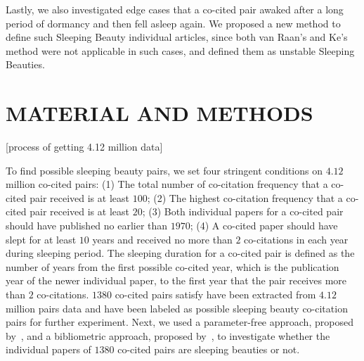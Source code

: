 \documentclass[utf8]{frontiersSCNS}
\begin{document}
Lastly, we also investigated edge cases that a co-cited pair awaked after a long period of dormancy and then fell asleep again. We proposed a new method to define such Sleeping Beauty individual articles, since both van Raan's and Ke's method were not applicable in such cases, and defined them as unstable Sleeping Beauties.

\section{MATERIAL AND METHODS}


[process of getting 4.12 million data]


To find possible sleeping beauty pairs, we set four stringent conditions on $4.12$ million co-cited pairs: (1) The total number of co-citation frequency that a co-cited pair received is at least $100$; (2) The highest co-citation frequency that a co-cited pair received is at least $20$; (3) Both individual papers for a co-cited pair should have published no earlier than $1970$; (4) A co-cited paper should have slept for at least $10$ years and received no more than $2$ co-citations in each year during sleeping period. 
The sleeping duration for a co-cited pair is defined as the number of years from the first possible co-cited year, which is the publication year of the newer individual paper, to the first year that the pair receives more than $2$ co-citations. $1380$ co-cited pairs satisfy have been extracted from $4.12$ million pairs data and have been labeled as possible sleeping beauty co-citation pairs for further experiment. 
Next, we used a parameter-free approach, proposed by~\citep{Ke2015}, and a bibliometric approach, proposed by~\citep{Raan2019}, to investigate whether the individual papers of $1380$ co-cited pairs are sleeping beauties or not. 
\end{document}
